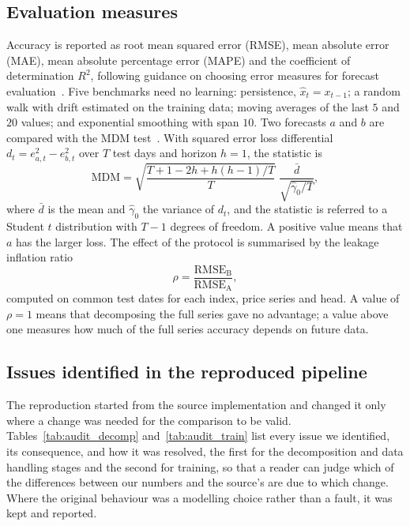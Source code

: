 \documentclass[pdflatex,sn-mathphys-num]{sn-jnl}%
\theoremstyle{thmstyleone}%
\theoremstyle{thmstyletwo}%
\theoremstyle{thmstylethree}%
\begin{document}
\subsection{Evaluation measures}
Accuracy is reported as root mean squared error (RMSE), mean absolute error
(MAE), mean absolute percentage error (MAPE) and the coefficient of
determination $R^2$, following guidance on choosing error measures for
forecast evaluation~\cite{hewamalage2022}. Five benchmarks need no learning:
persistence, $\hat{x}_t=x_{t-1}$; a random walk with drift estimated on the
training data; moving averages of the last $5$ and $20$ values; and
exponential smoothing with span $10$. Two forecasts $a$ and $b$ are compared
with the MDM test~\cite{mdmindex2023}. With squared error loss differential
$d_t=e_{a,t}^2-e_{b,t}^2$ over $T$ test days and horizon $h=1$, the statistic is
\begin{equation}
\mathrm{MDM}=\sqrt{\frac{T+1-2h+h(h-1)/T}{T}}\;
\frac{\bar{d}}{\sqrt{\hat{\gamma}_0/T}},
\label{eq:mdm}
\end{equation}
where $\bar{d}$ is the mean and $\hat{\gamma}_0$ the variance of $d_t$, and
the statistic is referred to a Student $t$ distribution with $T-1$ degrees of
freedom. A positive value means that $a$ has the larger loss. The effect of the
protocol is summarised by the leakage inflation ratio
\begin{equation}
\rho=\frac{\mathrm{RMSE}_{\mathrm{B}}}{\mathrm{RMSE}_{\mathrm{A}}},
\label{eq:rho}
\end{equation}
computed on common test dates for each index, price series and head. A value
of $\rho=1$ means that decomposing the full series gave no advantage; a value
above one measures how much of the full series accuracy depends on future
data.

\subsection{Issues identified in the reproduced pipeline}\label{sec:audit}
The reproduction started from the source implementation and changed it only
where a change was needed for the comparison to be valid.
Tables~\ref{tab:audit_decomp} and~\ref{tab:audit_train} list every issue we
identified, its consequence, and how it was resolved, the first for the
decomposition and data handling stages and the second for training, so that a
reader can judge which of the differences between our numbers and the source's
are due to which change. Where the original behaviour was a modelling choice
rather than a fault, it was kept and reported.
\end{document}
